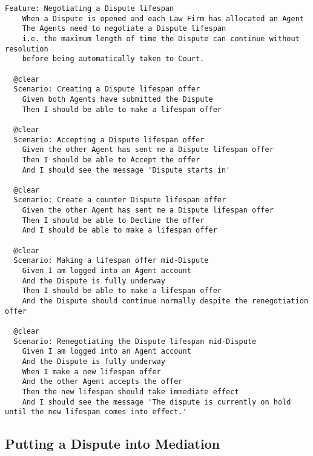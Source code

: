 \begin{lstlisting}
Feature: Negotiating a Dispute lifespan
    When a Dispute is opened and each Law Firm has allocated an Agent
    The Agents need to negotiate a Dispute lifespan
    i.e. the maximum length of time the Dispute can continue without resolution
    before being automatically taken to Court.

  @clear
  Scenario: Creating a Dispute lifespan offer
    Given both Agents have submitted the Dispute
    Then I should be able to make a lifespan offer

  @clear
  Scenario: Accepting a Dispute lifespan offer
    Given the other Agent has sent me a Dispute lifespan offer
    Then I should be able to Accept the offer
    And I should see the message 'Dispute starts in'

  @clear
  Scenario: Create a counter Dispute lifespan offer
    Given the other Agent has sent me a Dispute lifespan offer
    Then I should be able to Decline the offer
    And I should be able to make a lifespan offer

  @clear
  Scenario: Making a lifespan offer mid-Dispute
    Given I am logged into an Agent account
    And the Dispute is fully underway
    Then I should be able to make a lifespan offer
    And the Dispute should continue normally despite the renegotiation offer

  @clear
  Scenario: Renegotiating the Dispute lifespan mid-Dispute
    Given I am logged into an Agent account
    And the Dispute is fully underway
    When I make a new lifespan offer
    And the other Agent accepts the offer
    Then the new lifespan should take immediate effect
    And I should see the message 'The dispute is currently on hold until the new lifespan comes into effect.'
\end{lstlisting}

\subsection{Putting a Dispute into Mediation}

